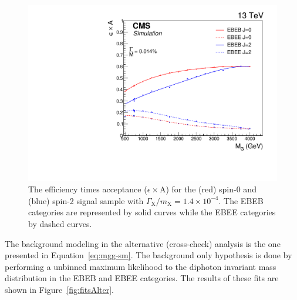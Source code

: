 \begin{figure}[htb]
    \centering
    \includegraphics[width=\cmsFigWidth]{HighMassDiphoton/AccEff_NarrowWidth_2016_SPIN0_AND_SPIN2.pdf}
     \caption{The
efficiency times acceptance ($\epsilon\times\mathrm{A}$) for the (red)
spin-0
and (blue) spin-2 signal sample with  $\Gamma_{\mathrm{X}}/m_{\mathrm{X}} =
1.4\times10^{-4}$. The EBEB categories are represented by solid curves
while the EBEE categories by dashed curves.
      \label{fig:diphotonComparison}
    }
\end{figure}

The background modeling in the alternative (cross-check) analysis is
the one presented in Equation~\ref{eq:mgg-sm}. The background only
hypothesis is done by performing a unbinned maximum likelihood to the
diphoton invariant mass distribution in the EBEB and EBEE
categories. The results of these fits are shown in
Figure~\ref{fig:fitsAlter}.

